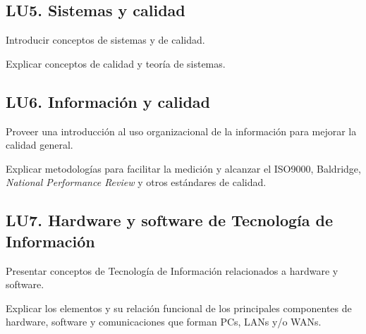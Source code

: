 \subsection{LU5. Sistemas y calidad}\label{sec:LU5}
\begin{LearningUnit}
\begin{LUGoal}
\item Introducir conceptos de sistemas y de calidad.
\end{LUGoal}

\begin{LUObjective}
\item Explicar conceptos de calidad y teoría de sistemas.
\end{LUObjective}
\end{LearningUnit}

\subsection{LU6. Información y calidad}\label{sec:LU6}
\begin{LearningUnit}
\begin{LUGoal}
\item Proveer una introducción al uso organizacional de la información para mejorar la calidad general.
\end{LUGoal}

\begin{LUObjective}
\item Explicar metodologías para facilitar la medición y alcanzar el ISO9000, Baldridge, {\it National Performance Review} y otros estándares de calidad.
\end{LUObjective}
\end{LearningUnit}

\subsection{LU7. Hardware y software de Tecnología de Información}\label{sec:LU7}
\begin{LearningUnit}
\begin{LUGoal}
\item Presentar conceptos de Tecnología de Información relacionados a hardware y software.
\end{LUGoal}

\begin{LUObjective}
\item Explicar los elementos y su relación funcional de los principales componentes de hardware, software y comunicaciones que forman PCs, LANs y/o WANs.
\end{LUObjective}
\end{LearningUnit}

